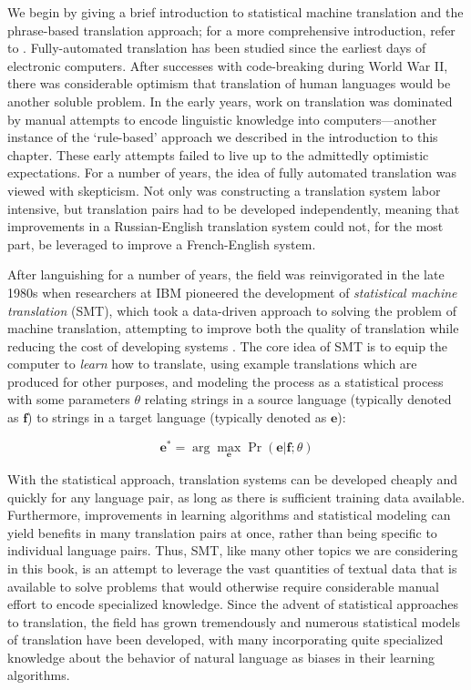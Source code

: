 We begin by giving a brief introduction to statistical machine
translation and the phrase-based translation approach; for a more
comprehensive introduction, refer to \cite{Koehn_2009,Lopez_2008}.
Fully-automated translation has been studied since the earliest days
of electronic computers.  After successes with code-breaking during
World War II, there was considerable optimism that translation of
human languages would be another soluble problem. In the early years,
work on translation was dominated by manual attempts to encode
linguistic knowledge into computers---another instance of the
`rule-based' approach we described in the introduction to this
chapter.  These early attempts failed to live up to the admittedly
optimistic expectations.  For a number of years, the idea of fully
automated translation was viewed with skepticism.  Not only was
constructing a translation system labor intensive, but translation
pairs had to be developed independently, meaning that improvements in
a Russian-English translation system could not, for the most part, be
leveraged to improve a French-English system.

After languishing for a number of years, the field was reinvigorated
in the late 1980s when researchers at IBM pioneered the development of
\emph{statistical machine translation} (SMT), which took a data-driven
approach to solving the problem of machine translation, attempting to
improve both the quality of translation while reducing the cost of
developing systems \cite{Brown_1993}.  The core idea of SMT is to
equip the computer to \emph{learn} how to translate, using example
translations which are produced for other purposes, and modeling the
process as a statistical process with some parameters $\theta$
relating strings in a source language (typically denoted as
$\textbf{f}$) to strings in a target language (typically denoted as
$\textbf{e}$):

\begin{equation}
\textbf{e}^* = \arg \max_{\textbf{e}} \Pr(\textbf{e} | \textbf{f} ; \theta)
\end{equation}

With the statistical approach, translation systems can be developed
cheaply and quickly for any language pair, as long as there is
sufficient training data available.  Furthermore, improvements in
learning algorithms and statistical modeling can yield benefits in
many translation pairs at once, rather than being specific to
individual language pairs.  Thus, SMT, like many other topics we are
considering in this book, is an attempt to leverage the vast
quantities of textual data that is available to solve problems that
would otherwise require considerable manual effort to encode
specialized knowledge. Since the advent of statistical approaches to
translation, the field has grown tremendously and numerous statistical
models of translation have been developed, with many incorporating
quite specialized knowledge about the behavior of natural language as
biases in their learning algorithms.

